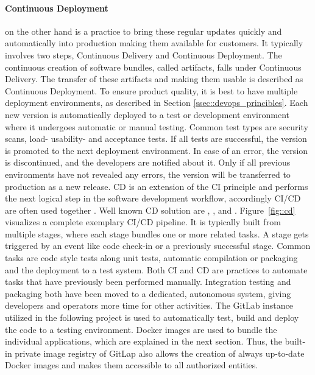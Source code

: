 \documentclass[12pt, a4paper]{article}
\begin{document}
        \paragraph{Continuous Deployment} on the other hand is a practice to bring these regular updates quickly and automatically into production making them available for customers. It typically involves two steps, Continuous Delivery and Continuous Deployment. The continuous creation of software bundles, called artifacts, falls under Continuous Delivery. The transfer of these artifacts and making them usable is described as Continuous Deployment. To ensure product quality, it is best to have multiple deployment environments, as described in Section \ref{ssec::devops_princibles}. Each new version is automatically deployed to a test or development environment where it undergoes automatic or manual testing. Common test types are security scans, load- usability- and acceptance tests. If all tests are successful, the version is promoted to the next deployment environment. In case of an error, the version is discontinued, and the developers are notified about it. Only if all previous environments have not revealed any errors, the version will be transferred to production as a new release. \ac{CD} is an extension of the \ac{CI} principle and performs the next logical step in the software development workflow, accordingly \ac{CI}/\ac{CD} are often used together \cite{azuredevops}. Well known \ac{CD} solution are , ,  and .\newline
        Figure~\ref{fig::cd} visualizes a complete exemplary \ac{CI}/\ac{CD} pipeline. It is typically built from multiple stages, where each stage bundles one or more related tasks. A stage gets triggered by an event like code check-in or a previously successful stage. Common tasks are code style tests along unit tests, automatic compilation or packaging and the deployment to a test system.\newline
        Both \ac{CI} and \ac{CD} are practices to automate tasks that have previously been performed manually. Integration testing and packaging both have been moved to a dedicated, autonomous system, giving developers and operators more time for other activities.\newline
        The GitLab instance utilized in the following project is used to automatically test, build and deploy the code to a testing environment. Docker images are used to bundle the individual applications, which are explained in the next section. Thus, the built-in private image registry of GitLap also allows the creation of always up-to-date Docker images and makes them accessible to all authorized entities.
        
\end{document}
